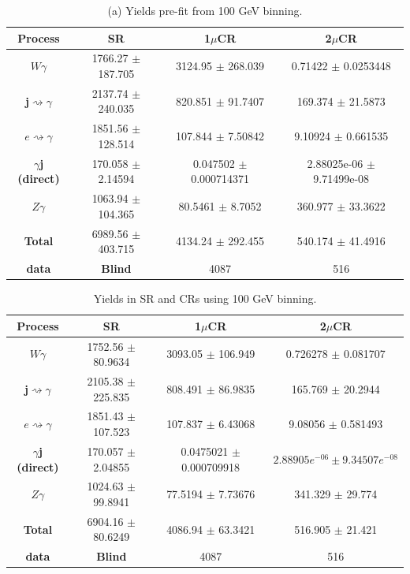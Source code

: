 \begin{table}[!ht]
        \centering 
        \begin{tabular}{|c| c | c | c |}
        \hline
        \textbf{Process} & \textbf{SR} & \textbf{1$\mu$CR} & \textbf{2$\mu$CR}  \\
        \hline
        \textbf{$W\gamma$} &1766.27 $\pm$ 187.705 & 3124.95 $\pm$ 268.039 & 0.71422 $\pm$ 0.0253448 \\ \hline
        \textbf{j$\rightsquigarrow\gamma$}   & 2137.74 $\pm$ 240.035 & 820.851 $\pm$ 91.7407 & 169.374 $\pm$ 21.5873 \\ \hline
        \textbf{$e\rightsquigarrow\gamma$}   &1851.56 $\pm$ 128.514 & 107.844 $\pm$ 7.50842 & 9.10924 $\pm$ 0.661535 \\ \hline
        \textbf{$\gamma$j (direct)}   &170.058 $\pm$ 2.14594 & 0.047502 $\pm$ 0.000714371 & 2.88025e-06 $\pm$ 9.71499e-08 \\ \hline
        \textbf{$Z\gamma$}   &1063.94 $\pm$ 104.365 & 80.5461 $\pm$ 8.7052 & 360.977 $\pm$ 33.3622 \\ \hline
        \textbf{Total}  & 6989.56 $\pm$ 403.715 & 4134.24 $\pm$ 292.455 & 540.174 $\pm$ 41.4916 \\ \hline
        \textbf{data}  & \textbf{Blind} &4087 & 516\\ 
        \hline
        \end{tabular}
        \caption*{(a) Yields pre-fit from 100 GeV binning.}
\end{table}

\begin{table}[!ht]
        \centering 
        \begin{tabular}{|c| c | c | c |}
        \hline
        \textbf{Process} & \textbf{SR} & \textbf{1$\mu$CR} & \textbf{2$\mu$CR} \\
        \hline
        \textbf{$W\gamma$} &1752.56 $\pm$ 80.9634 & 3093.05 $\pm$ 106.949 & 0.726278 $\pm$ 0.081707 \\ \hline
        \textbf{j$\rightsquigarrow\gamma$}   &2105.38 $\pm$ 225.835 & 808.491 $\pm$ 86.9835 & 165.769 $\pm$ 20.2944 \\ \hline
        \textbf{$e\rightsquigarrow\gamma$}   &1851.43 $\pm$ 107.523 & 107.837 $\pm$ 6.43068 & 9.08056 $\pm$ 0.581493 \\ \hline
        \textbf{$\gamma$j (direct)}   &170.057 $\pm$ 2.04855 & 0.0475021 $\pm$ 0.000709918 & ${2.88905e^{-06} \pm 9.34507e^{-08}}$ \\ \hline
        \textbf{$Z\gamma$}   & 1024.63 $\pm$ 99.8941 & 77.5194 $\pm$ 7.73676 & 341.329 $\pm$ 29.774 \\ \hline
        \textbf{Total}  & 6904.16 $\pm$ 80.6249 & 4086.94 $\pm$ 63.3421 & 516.905 $\pm$ 21.421 \\ \hline
        \textbf{data}  & \textbf{Blind} &4087 & 516\\ 
        \hline
        \end{tabular}
        \caption*{(b) Yields post-fit from 100 GeV binning.}
        \caption{Yields in SR and CRs using 100 GeV binning.}
\label{tab:yield_100GeV}
\end{table}


